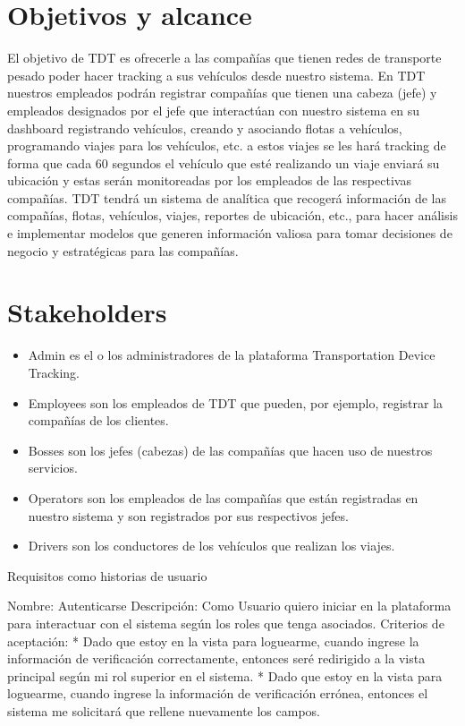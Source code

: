 \documentclass{article}
\begin{document}
\section{Objetivos y alcance} 
El objetivo de TDT es ofrecerle a las compañías que tienen redes de transporte pesado poder hacer tracking a sus vehículos desde nuestro sistema. En TDT nuestros empleados podrán registrar compañías que tienen una cabeza (jefe) y empleados designados por el jefe que interactúan con nuestro sistema en su dashboard registrando vehículos, creando y asociando flotas a vehículos, programando viajes para los vehículos, etc. a estos viajes se les hará tracking de forma que cada 60 segundos el vehículo que esté realizando un viaje enviará su ubicación y estas serán monitoreadas por los empleados de las respectivas compañías. TDT tendrá un sistema de analítica que recogerá información de las compañías, flotas, vehículos, viajes, reportes de ubicación, etc., para hacer análisis e implementar modelos que generen información valiosa para tomar decisiones de negocio y estratégicas para las compañías.

\section{Stakeholders}

\begin{itemize}
    \item{Admin} es el o los administradores de la plataforma Transportation Device Tracking.
    \item{Employees} son los empleados de TDT que pueden, por ejemplo, registrar la compañías de los clientes.
    \item{Bosses} son los jefes (cabezas) de las compañías que hacen uso de nuestros servicios.
    \item{Operators} son los empleados de las compañías que están registradas en nuestro sistema y son registrados por sus respectivos jefes.
    \item{Drivers} son los conductores de los vehículos que realizan los viajes.
\end{itemize}

Requisitos como historias de usuario

Nombre: Autenticarse
Descripción: Como Usuario quiero iniciar en la plataforma para interactuar con el sistema según los roles que tenga asociados.
Criterios de aceptación:
* Dado que estoy en la vista para loguearme, cuando ingrese la información de verificación correctamente, entonces seré redirigido a la vista principal según mi rol superior en el sistema.
* Dado que estoy en la vista para loguearme, cuando ingrese la información de verificación errónea, entonces el sistema me solicitará que rellene nuevamente los campos.
\end{document}
